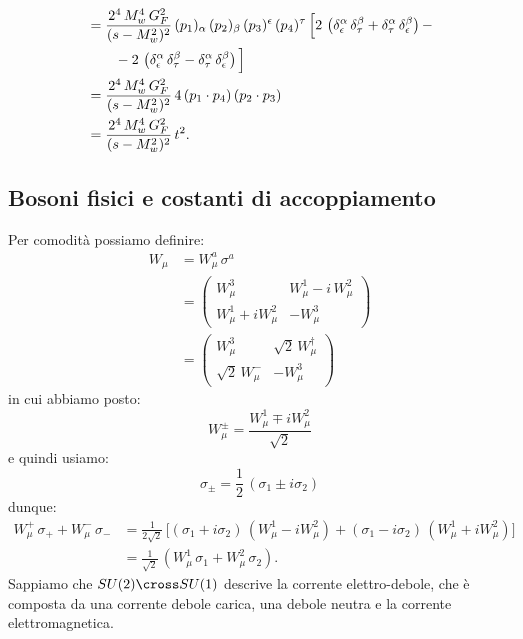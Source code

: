 \begin{align}
    &= \frac{2^4\, M_w^4\, G_F^2}{(s-M_w^2)^2}\, (p_1)_\alpha\, (p_2)_\beta\, (p_3)^\epsilon\, (p_4)^\tau\, \Big[ 2\, \left( \delta_\epsilon^\alpha\, \delta_\tau^\beta + \delta_\tau^\alpha\, \delta_\epsilon^\beta \right) - \notag \\
    &\qquad - 2\, \left( \delta_\epsilon^\alpha\, \delta_\tau^\beta - \delta_\tau^\alpha\, \delta_\epsilon^\beta \right) \Big] \\
    &= \frac{2^4\, M_w^4\, G_F^2}{(s-M_w^2)^2}\, 4\, (p_1\cdot p_4)\, (p_2\cdot p_3) \\
    &= \frac{2^4\, M_w^4\, G_F^2}{(s-M_w^2)^2}\, t^2.
\end{align}


\subsection{Bosoni fisici e costanti di accoppiamento}

Per comodità possiamo definire:
\begin{align}
    W_\mu &= W_\mu^a\, \sigma^a \\
    &= \begin{pmatrix}
        W^3_\mu & W_\mu^1 - i\, W_\mu^2 \\
        W_\mu^1 + iW_\mu^2 & -W_\mu^3
    \end{pmatrix} \\
    &= \begin{pmatrix}
        W_\mu^3 & \sqrt{2}\, W_\mu^\dagger \\
        \sqrt{2}\, W_\mu^- & - W_\mu^3
    \end{pmatrix}
\end{align}
in cui abbiamo posto:
\begin{equation}
    W_\mu^\pm = \frac{W_\mu^1 \mp iW_\mu^2}{\sqrt{2}}
\end{equation}
e quindi usiamo:
\begin{equation}
    \sigma_\pm = \frac{1}{2}\, (\sigma_1 \pm i\sigma_2)
\end{equation}
dunque:
\begin{align}
    W_\mu^+\, \sigma_+ + W_\mu^-\, \sigma_- &= \frac{1}{2\sqrt{2}}\, \Big[ (\sigma_1 + i\sigma_2)\, (W_\mu^1 - iW_\mu^2) + (\sigma_1 - i\sigma_2)\, (W_\mu^1 + iW_\mu^2) \Big] \\
    &= \frac{1}{\sqrt{2}}\, (W_\mu^1\, \sigma_1 + W_\mu^2\, \sigma_2).
\end{align}
Sappiamo che $SU(2) \cross SU(1)$ descrive la corrente elettro-debole, che è composta da una corrente debole carica, una debole neutra e la corrente elettromagnetica.

